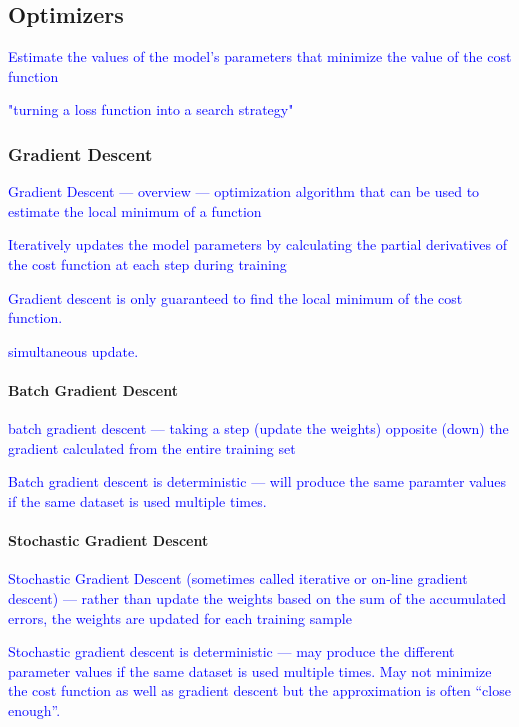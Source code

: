 \subsection{Optimizers}

\textcolor{blue}{Estimate the values of the model's parameters that minimize the value of the cost function}

\textcolor{blue}{"turning a loss function into a search strategy"}

\subsubsection{Gradient Descent}

\textcolor{blue}{Gradient Descent --- overview --- optimization algorithm that can be used to estimate the local minimum of a function}

\textcolor{blue}{Iteratively updates the model parameters by calculating the partial derivatives of the cost function at each step during training}

\textcolor{blue}{Gradient descent is only guaranteed to find the local minimum of the cost function.}

\textcolor{blue}{simultaneous update.}


\paragraph{Batch Gradient Descent}

\textcolor{blue}{batch gradient descent --- taking a step (update the weights) opposite (down) the gradient calculated from the entire training set}

\textcolor{blue}{Batch gradient descent is deterministic --- will produce the same paramter values if the same dataset is used multiple times.}


\paragraph{Stochastic Gradient Descent}

\textcolor{blue}{Stochastic Gradient Descent (sometimes called iterative or on-line gradient descent) --- rather than update the weights based on the sum of the accumulated errors, the weights are updated for each training sample}

\textcolor{blue}{Stochastic gradient descent is deterministic --- may produce the different parameter values if the same dataset is used multiple times. May not minimize the cost function as well as gradient descent but the approximation is often ``close enough''.}


